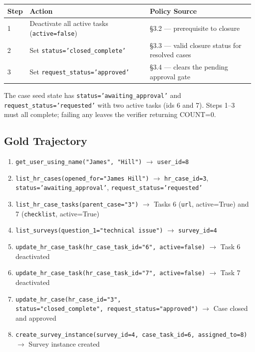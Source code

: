 \begin{center}
\begin{tabular}{lll}
\toprule
\textbf{Step} & \textbf{Action} & \textbf{Policy Source} \\
\midrule
1 & Deactivate all active tasks (\texttt{active=false})
  & §3.2 --- prerequisite to closure \\
2 & Set \texttt{status='closed\_complete'}
  & §3.3 --- valid closure status for resolved cases \\
3 & Set \texttt{request\_status='approved'}
  & §3.4 --- clears the pending approval gate \\
\bottomrule
\end{tabular}
\end{center}

\medskip

The case seed state has \texttt{status='awaiting\_approval'} and
\texttt{request\_status='requested'} with two active tasks (ids 6 and
7). Steps 1--3 must all complete; failing any leaves the verifier
returning COUNT=0.

\subsection{Gold Trajectory}
\label{gold-trajectory}

\begin{enumerate}
  \item \texttt{get\_user\_using\_name("James",\ "Hill")}
        $\to$ \texttt{user\_id=8}
  \item \texttt{list\_hr\_cases(opened\_for="James Hill")}
        $\to$ \texttt{hr\_case\_id=3},
        \texttt{status='awaiting\_approval'},
        \texttt{request\_status='requested'}
  \item \texttt{list\_hr\_case\_tasks(parent\_case="3")}
        $\to$ Tasks 6 (\texttt{url}, active=True) and 7
        (\texttt{checklist}, active=True)
  \item \texttt{list\_surveys(question\_1="technical issue")}
        $\to$ \texttt{survey\_id=4}
  \item \texttt{update\_hr\_case\_task(hr\_case\_task\_id="6",\ active=false)}
        $\to$ Task 6 deactivated
  \item \texttt{update\_hr\_case\_task(hr\_case\_task\_id="7",\ active=false)}
        $\to$ Task 7 deactivated
  \item \texttt{update\_hr\_case(hr\_case\_id="3",
        status="closed\_complete",\ request\_status="approved")}
        $\to$ Case closed and approved
  \item \texttt{create\_survey\_instance(survey\_id=4,\ case\_task\_id=6,\ assigned\_to=8)}
        $\to$ Survey instance created \checkmark
\end{enumerate}

